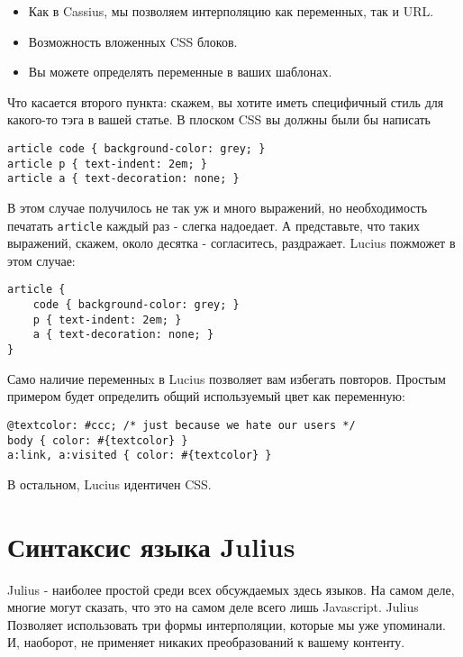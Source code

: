 \begin{itemize}
\item Как в Cassius, мы позволяем интерполяцию как переменных, так и URL.
\item Возможность вложенных CSS блоков.
\item Вы можете определять переменные в ваших шаблонах.
\end{itemize}

Что касается второго пункта: скажем, вы хотите иметь специфичный стиль для 
какого-то тэга в вашей статье. В плоском CSS вы должны были бы написать

\begin{lstlisting}
article code { background-color: grey; }
article p { text-indent: 2em; }
article a { text-decoration: none; }
\end{lstlisting}

В этом случае получилось не так уж и много выражений, но необходимость печатать
\texttt{article} каждый раз - слегка надоедает. А представьте, что таких выражений, 
скажем, около десятка - согласитесь, раздражает.
Lucius пожможет в этом случае:

\begin{lstlisting}
article {
    code { background-color: grey; }
    p { text-indent: 2em; }
    a { text-decoration: none; }
}
\end{lstlisting}

Само наличие переменныx в Lucius позволяет вам избегать повторов. Простым примером
будет определить общий используемый цвет как переменную:

\begin{lstlisting}
@textcolor: #ccc; /* just because we hate our users */
body { color: #{textcolor} }
a:link, a:visited { color: #{textcolor} }
\end{lstlisting}

В остальном, Lucius идентичен CSS.

\section{Синтаксис языка Julius}

Julius - наиболее простой среди всех обсуждаемых здесь языков. На самом деле, 
многие могут сказать, что это на самом деле всего лишь Javascript. Julius
Позволяет использовать три формы интерполяции, которые мы уже упоминали.
И, наоборот, не применяет никаких преобразований к вашему контенту.

